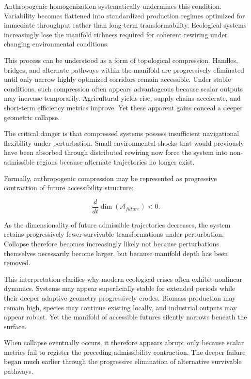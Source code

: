 \documentclass[11pt,a4paper]{article}
\newcommand{\Aspace}{\mathcal{A}}
\begin{document}
Anthropogenic homogenization systematically undermines this condition. Variability becomes flattened into standardized production regimes optimized for immediate throughput rather than long-term transformability. Ecological systems increasingly lose the manifold richness required for coherent rewiring under changing environmental conditions.

This process can be understood as a form of topological compression. Handles, bridges, and alternate pathways within the manifold are progressively eliminated until only narrow highly optimized corridors remain accessible. Under stable conditions, such compression often appears advantageous because scalar outputs may increase temporarily. Agricultural yields rise, supply chains accelerate, and short-term efficiency metrics improve. Yet these apparent gains conceal a deeper geometric collapse.

The critical danger is that compressed systems possess insufficient navigational flexibility under perturbation. Small environmental shocks that would previously have been absorbed through distributed rewiring now force the system into non-admissible regions because alternate trajectories no longer exist.

Formally, anthropogenic compression may be represented as progressive contraction of future accessibility structure:

\[
\frac{d}{dt}\dim(\Aspace_{future}) < 0.
\]

As the dimensionality of future admissible trajectories decreases, the system retains progressively fewer survivable transformations under perturbation. Collapse therefore becomes increasingly likely not because perturbations themselves necessarily become larger, but because manifold depth has been removed.

This interpretation clarifies why modern ecological crises often exhibit nonlinear dynamics. Systems may appear superficially stable for extended periods while their deeper adaptive geometry progressively erodes. Biomass production may remain high, species may continue existing locally, and industrial outputs may appear robust. Yet the manifold of accessible futures silently narrows beneath the surface.

When collapse eventually occurs, it therefore appears abrupt only because scalar metrics fail to register the preceding admissibility contraction. The deeper failure began much earlier through the progressive elimination of alternative survivable pathways.
\end{document}
